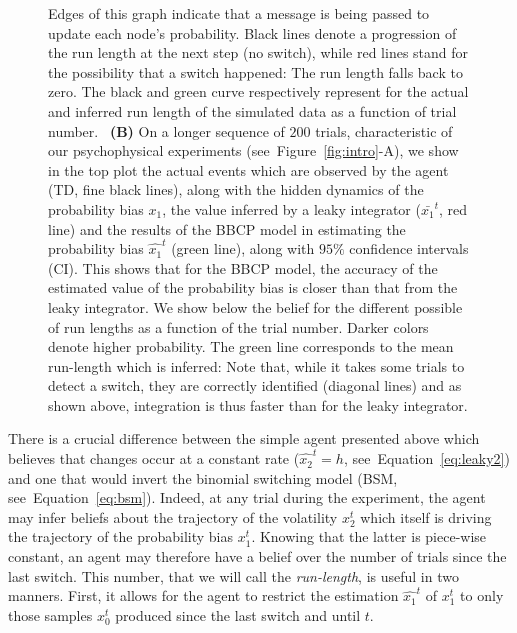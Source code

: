 \documentclass[12pt,english]{article}%
\newcommand{\seeFig}[1]{Figure~\ref{fig:#1}}
\newcommand{\seeEq}[1]{Equation~\ref{eq:#1}}
\begin{document}
\begin{figure}
{Edges of this graph indicate that a message is being passed
to update each node's probability.
Black lines denote a progression of the run length at the next step (no switch),
while red lines stand for the possibility that a switch happened:
The run length falls back to zero.
The black and green curve respectively represent for
the actual and inferred run length of the simulated data
as a function of trial number.
~\textbf{(B)} On a longer sequence of $200$ trials,
characteristic of our psychophysical experiments (see~\seeFig{intro}-A), %
we show in the top plot
the actual events which are observed by the agent (TD, fine black lines),
along with the hidden dynamics of the probability bias $x_1$,
the value inferred by a leaky integrator ($\bar{x_1}^t$, red line)
and the results of the BBCP model 
in estimating the probability bias $\hat{x_1}^t$ (green line),
along with $95\%$ confidence intervals (CI).
This shows that for the BBCP model,
the accuracy of the estimated value of the probability bias
is closer than that from the leaky integrator.
We show below the belief for the different possible of run lengths
as a function of the trial number. 
Darker colors denote higher probability. 
The green line corresponds to the mean run-length which is inferred:
Note that, while it takes some trials to detect a switch,
they are correctly identified (diagonal lines) and
as shown above, integration is thus faster than for the leaky integrator.
}
\label{fig:bayesianchangepoint}
\end{figure}
There is a crucial difference between the simple agent presented above
which believes that changes occur at a constant rate ($\hat{x_2}^t=h$, see~\seeEq{leaky2})
and one that would invert the binomial switching model (BSM, see~\seeEq{bsm}).
Indeed, at any trial during the experiment,
the agent may infer beliefs about the trajectory of the volatility $x_2^t$
which itself is driving the trajectory of the probability bias $x_1^t$.
Knowing that the latter is piece-wise constant,
an agent may therefore have a belief over the number of trials since the last switch.
This number, that we will call the \emph{run-length}, is useful in two manners.
First, it allows for the agent to restrict the estimation $\hat{x_1}^{t}$ of $x_1^t$
to only those samples $x_0^t$ produced since the last switch and until $t$.
\end{document}
